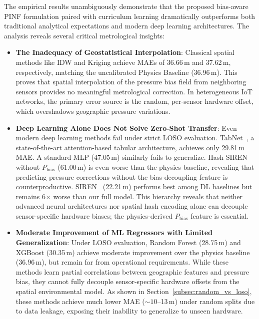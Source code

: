 The empirical results unambiguously demonstrate that the proposed bias-aware PINF formulation paired with curriculum learning dramatically outperforms both traditional analytical expectations and modern deep learning architectures. The analysis reveals several critical metrological insights:
\begin{itemize}
    \item \textbf{The Inadequacy of Geostatistical Interpolation}: Classical spatial methods like IDW and Kriging achieve MAEs of 36.66\,m and 37.62\,m, respectively, matching the uncalibrated Physics Baseline (36.96\,m). This proves that spatial interpolation of the pressure bias field from neighboring sensors provides no meaningful metrological correction. In heterogeneous IoT networks, the primary error source is the random, per-sensor hardware offset, which overshadows geographic pressure variations.
    
    \item \textbf{Deep Learning Alone Does Not Solve Zero-Shot Transfer}: Even modern deep learning methods fail under strict LOSO evaluation. TabNet~\cite{arik2021tabnet}, a state-of-the-art attention-based tabular architecture, achieves only 29.81\,m MAE. A standard MLP (47.05\,m) similarly fails to generalize. Hash-SIREN without $P_{\text{bias}}$ (61.00\,m) is even worse than the physics baseline, revealing that predicting pressure corrections without the bias-decoupling feature is counterproductive. SIREN~\cite{sitzmann2020implicit} (22.21\,m) performs best among DL baselines but remains 6$\times$ worse than our full model. This hierarchy reveals that neither advanced neural architectures nor spatial hash encoding alone can decouple sensor-specific hardware biases; the physics-derived $P_{\text{bias}}$ feature is essential.
    
    \item \textbf{Moderate Improvement of ML Regressors with Limited Generalization}: Under LOSO evaluation, Random Forest (28.75\,m) and XGBoost (30.35\,m) achieve moderate improvement over the physics baseline (36.96\,m), but remain far from operational requirements. While these methods learn partial correlations between geographic features and pressure bias, they cannot fully decouple sensor-specific hardware offsets from the spatial environmental model. As shown in Section~\ref{subsec:random_vs_loso}, these methods achieve much lower MAE (${\sim}10$--13\,m) under random splits due to data leakage, exposing their inability to generalize to unseen hardware.
    

\end{itemize}
